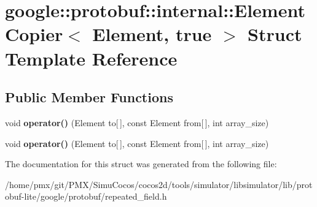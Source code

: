 \hypertarget{structgoogle_1_1protobuf_1_1internal_1_1ElementCopier_3_01Element_00_01true_01_4}{}\section{google\+:\+:protobuf\+:\+:internal\+:\+:Element\+Copier$<$ Element, true $>$ Struct Template Reference}
\label{structgoogle_1_1protobuf_1_1internal_1_1ElementCopier_3_01Element_00_01true_01_4}
\subsection*{Public Member Functions}
\begin{DoxyCompactItemize}
\item 
\mbox{\label{structgoogle_1_1protobuf_1_1internal_1_1ElementCopier_3_01Element_00_01true_01_4_ae5c4d8f7d72fedd28278c09d340c00ff}} 
void {\bfseries operator()} (Element to\mbox{[}$\,$\mbox{]}, const Element from\mbox{[}$\,$\mbox{]}, int array\+\_\+size)
\item 
\mbox{\label{structgoogle_1_1protobuf_1_1internal_1_1ElementCopier_3_01Element_00_01true_01_4_ae5c4d8f7d72fedd28278c09d340c00ff}} 
void {\bfseries operator()} (Element to\mbox{[}$\,$\mbox{]}, const Element from\mbox{[}$\,$\mbox{]}, int array\+\_\+size)
\end{DoxyCompactItemize}


The documentation for this struct was generated from the following file\+:\begin{DoxyCompactItemize}
\item 
/home/pmx/git/\+P\+M\+X/\+Simu\+Cocos/cocos2d/tools/simulator/libsimulator/lib/protobuf-\/lite/google/protobuf/repeated\+\_\+field.\+h\end{DoxyCompactItemize}
